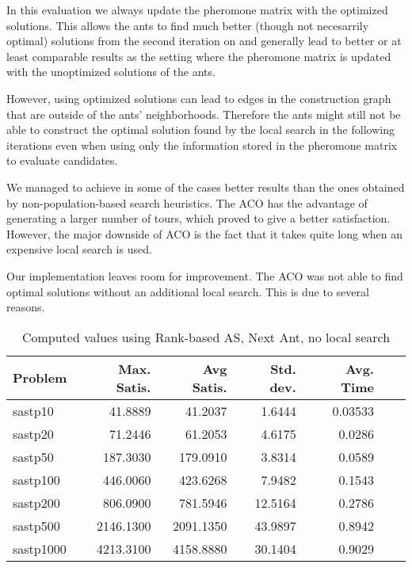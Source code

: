 \documentclass{article}
\begin{document}
In this evaluation we always update the pheromone matrix with the optimized solutions. This allows the ants to find much better (though not
necesarrily optimal) solutions from the second iteration on and generally lead to better or at least comparable results as the setting where
the pheromone matrix is updated with the unoptimized solutions of the ants.

However, using optimized solutions can lead to edges in the construction graph that are outside of the ants' neighborhoods. Therefore the
ants might still not be able to construct the optimal solution found by the local search in the following iterations even when using only
the information stored in the pheromone matrix to evaluate candidates.
\medskip

We managed to achieve in some of the cases better results than the ones obtained by non-population-based search heuristics. 
The ACO has the advantage of generating a larger number of tours, which proved to give a better satisfaction. 
However, the major downside of ACO is the fact that it takes quite long when an expensive local search is used.

Our implementation leaves room for improvement.
The ACO was not able to find optimal solutions without an additional local search. This is due to several reasons.





\begin{table}[b!]
  \caption{Computed values using Rank-based AS, Next Ant, no local search}
  \label{tab:conf1}
  \setlength{\tabcolsep}{1.4mm}
  \centering
  \begin{tabular}{lrrrrrr}
    \bfseries Problem & 
    \bfseries Max. Satis. &
    \bfseries Avg Satis. &
    \bfseries Std. dev. &
    \bfseries Avg. Time 
    \\\hline
    sastp10 & 41.8889 & 41.2037 & 1.6444 & 0.03533 \\ 
	sastp20 & 71.2446 & 61.2053 & 4.6175 & 0.0286 \\ 
	sastp50 & 187.3030 & 179.0910 & 3.8314 & 0.0589 \\ 
	sastp100 & 446.0060 & 423.6268 & 7.9482 & 0.1543 \\ 
	sastp200 & 806.0900 & 781.5946 & 12.5164 & 0.2786 \\ 
	sastp500 & 2146.1300 & 2091.1350 & 43.9897 & 0.8942 \\ 
	sastp1000 & 4213.3100 & 4158.8880 & 30.1404 & 0.9029 
    \\\hline
  \end{tabular}

\end{table}
\end{document}

